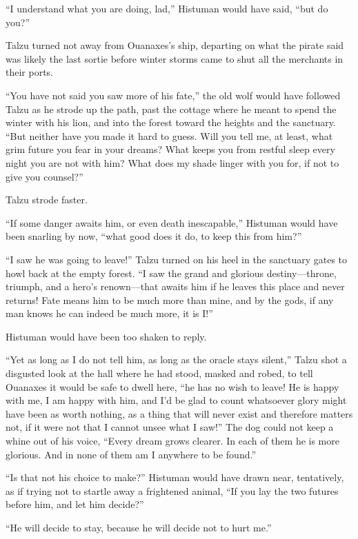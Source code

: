 ``I understand what you are doing, lad,'' Histuman would have said, ``but do you?''

Talzu turned not away from Ouanaxes's ship, departing on what the pirate said was likely the last sortie before winter storms came to shut all the merchants in their ports.

``You have not said you saw more of his fate,'' the old wolf would have followed Talzu as he strode up the path, past the cottage where he meant to spend the winter with his lion, and into the forest toward the heights and the sanctuary. ``But neither have you made it hard to guess. Will you tell me, at least, what grim future you fear in your dreams? What keeps you from restful sleep every night you are not with him? What does my shade linger with you for, if not to give you counsel?''

Talzu strode faster.

``If some danger awaits him, or even death inescapable,'' Histuman would have been snarling by now, ``what good does it do, to keep this from him?''

``I saw he was going to leave!'' Talzu turned on his heel in the sanctuary gates to howl back at the empty forest. ``I saw the grand and glorious destiny---throne, triumph, and a hero's renown---that awaits him if he leaves this place and never returns! Fate means him to be much more than mine, and by the gods, if any man knows he can indeed be much more, it is I!''

Histuman would have been too shaken to reply.

``Yet as long as I do not tell him, as long as the oracle stays silent,'' Talzu shot a disgusted look at the hall where he had stood, masked and robed, to tell Ouanaxes it would be safe to dwell here, ``he has no wish to leave! He is happy with me, I am happy with him, and I'd be glad to count whatsoever glory might have been as worth nothing, as a thing that will never exist and therefore matters not, if it were not that I cannot unsee what I saw!'' The dog could not keep a whine out of his voice, ``Every dream grows clearer. In each of them he is more glorious. And in none of them am I anywhere to be found.''

``Is that not his choice to make?'' Histuman would have drawn near, tentatively, as if trying not to startle away a frightened animal, ``If you lay the two futures before him, and let him decide?''

``He will decide to stay, because he will decide not to hurt me.''

